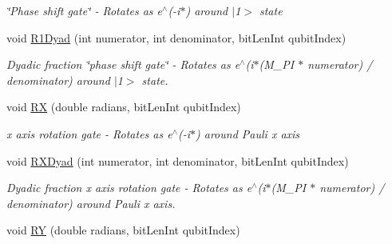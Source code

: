 \begin{DoxyCompactItemize}
\begin{DoxyCompactList}\small\item\em \char`\"{}\+Phase shift gate\char`\"{} -\/ Rotates as e$^\wedge$(-\/i$\ast$) around $\vert$1$>$ state \end{DoxyCompactList}\item 
void \hyperlink{classQrack_1_1Register_aaa97b178131d0073d0f0b60131297201}{R1\+Dyad} (int numerator, int denominator, bit\+Len\+Int qubit\+Index)
\begin{DoxyCompactList}\small\item\em Dyadic fraction \char`\"{}phase shift gate\char`\"{} -\/ Rotates as e$^\wedge$(i$\ast$(M\+\_\+\+PI $\ast$ numerator) / denominator) around $\vert$1$>$ state. \end{DoxyCompactList}\item 
void \hyperlink{classQrack_1_1Register_a7827b5498c4b20926a98a98235df2b71}{RX} (double radians, bit\+Len\+Int qubit\+Index)\hypertarget{classQrack_1_1Register_a7827b5498c4b20926a98a98235df2b71}{}\label{classQrack_1_1Register_a7827b5498c4b20926a98a98235df2b71}

\begin{DoxyCompactList}\small\item\em x axis rotation gate -\/ Rotates as e$^\wedge$(-\/i$\ast$) around Pauli x axis \end{DoxyCompactList}\item 
void \hyperlink{classQrack_1_1Register_a4a3d6827d171bfad34fdb08788c55819}{R\+X\+Dyad} (int numerator, int denominator, bit\+Len\+Int qubit\+Index)
\begin{DoxyCompactList}\small\item\em Dyadic fraction x axis rotation gate -\/ Rotates as e$^\wedge$(i$\ast$(M\+\_\+\+PI $\ast$ numerator) / denominator) around Pauli x axis. \end{DoxyCompactList}\item 
void \hyperlink{classQrack_1_1Register_ae6b11e5e58b0c8c8a7c7d58a2e962547}{RY} (double radians, bit\+Len\+Int qubit\+Index)\hypertarget{classQrack_1_1Register_ae6b11e5e58b0c8c8a7c7d58a2e962547}{}\label{classQrack_1_1Register_ae6b11e5e58b0c8c8a7c7d58a2e962547}


\end{DoxyCompactItemize}
